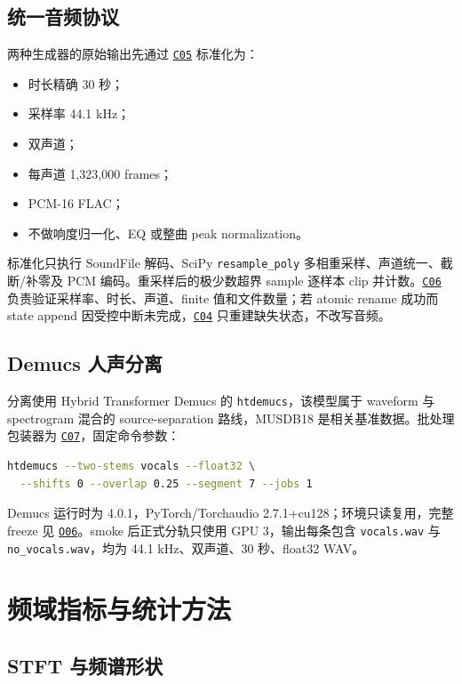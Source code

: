 \documentclass[UTF8,11pt,a4paper,fontset=none]{ctexart}
\newcommand{\coderef}[1]{\hyperlink{code:#1}{\texttt{#1}}}
\newcommand{\outref}[1]{\hyperlink{output:#1}{\texttt{#1}}}
\begin{document}
\subsection{统一音频协议}

两种生成器的原始输出先通过 \coderef{C05} 标准化为：

\begin{itemize}
  \item 时长精确 30 秒；
  \item 采样率 44.1 kHz；
  \item 双声道；
  \item 每声道 1,323,000 frames；
  \item PCM-16 FLAC；
  \item 不做响度归一化、EQ 或整曲 peak normalization。
\end{itemize}

标准化只执行 SoundFile 解码、SciPy \texttt{resample\_poly} 多相重采样、声道统一、截断/补零及 PCM 编码。重采样后的极少数超界 sample 逐样本 clip 并计数。\coderef{C06} 负责验证采样率、时长、声道、finite 值和文件数量；若 atomic rename 成功而 state append 因受控中断未完成，\coderef{C04} 只重建缺失状态，不改写音频。

\subsection{Demucs 人声分离}

分离使用 Hybrid Transformer Demucs\citep{demucs2021} 的 \texttt{htdemucs}，该模型属于 waveform 与 spectrogram 混合的 source-separation 路线，MUSDB18 是相关基准数据\citep{musdb18}。批处理包装器为 \coderef{C07}，固定命令参数：

\begin{lstlisting}[language=bash,caption={冻结的 Demucs vocal-only 参数。}]
htdemucs --two-stems vocals --float32 \
  --shifts 0 --overlap 0.25 --segment 7 --jobs 1
\end{lstlisting}

Demucs 运行时为 4.0.1，PyTorch/Torchaudio 2.7.1+cu128；环境只读复用，完整 freeze 见 \outref{O06}。smoke 后正式分轨只使用 GPU 3，输出每条包含 \texttt{vocals.wav} 与 \texttt{no\_vocals.wav}，均为 44.1 kHz、双声道、30 秒、float32 WAV。

\section{频域指标与统计方法}
\label{sec:method}

\subsection{STFT 与频谱形状}
\end{document}
